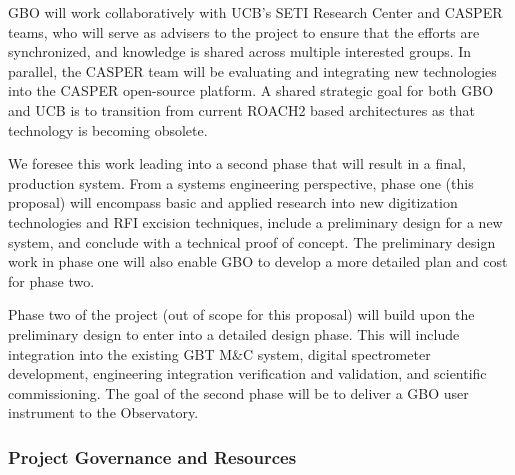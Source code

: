 \documentclass[10pt]{myNSF}
\begin{document}
GBO will work collaboratively with UCB's SETI Research Center
and CASPER teams, who will serve as advisers to the project to ensure
that the efforts are synchronized, and knowledge is shared across
multiple interested groups.  In parallel, the CASPER team will be
evaluating and integrating new technologies into the CASPER
open-source platform.  A shared strategic goal for both GBO and
UCB is to transition from current ROACH2 based architectures
as that technology is becoming obsolete.

We foresee this work leading into a second phase that will result in a
final, production system.  From a systems engineering perspective,
phase one (this proposal) will encompass basic and applied research
into new digitization technologies and RFI excision techniques,
include a preliminary design for a new system, and conclude with a
technical proof of concept. The preliminary design work in phase one
will also enable GBO to develop a more detailed plan and cost for
phase two.

Phase two of the project (out of scope for this proposal) will build
upon the preliminary design to enter into a detailed design phase.
This will include integration into the existing GBT M\&C system,
digital spectrometer development, engineering integration verification
and validation, and scientific commissioning.  The goal of the second
phase will be to deliver a GBO user instrument to the Observatory.

\subsubsection{Project Governance and Resources}
\label{sec:governance}

\label{sec:team}
\end{document}
